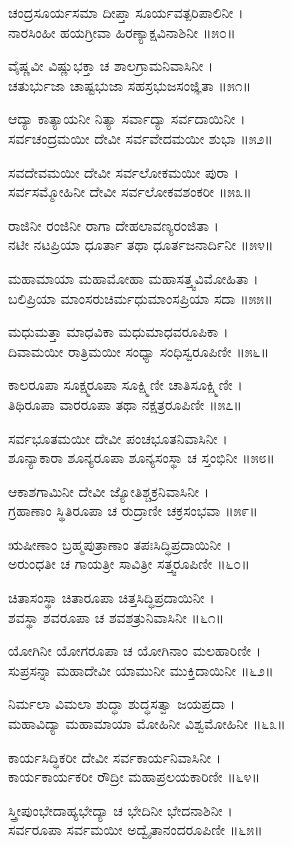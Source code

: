 ಚಂದ್ರಸೂರ್ಯಸಮಾ ದೀಪ್ತಾ ಸೂರ್ಯವತ್ಪರಿಪಾಲಿನೀ ।\\
ನಾರಸಿಂಹೀ ಹಯಗ್ರೀವಾ ಹಿರಣ್ಯಾಕ್ಷವಿನಾಶಿನೀ ॥೫೦॥

ವೈಷ್ಣವೀ ವಿಷ್ಣುಭಕ್ತಾ ಚ ಶಾಲಗ್ರಾಮನಿವಾಸಿನೀ ।\\
ಚತುರ್ಭುಜಾ ಚಾಷ್ಟಭುಜಾ ಸಹಸ್ರಭುಜಸಂಜ್ಞಿತಾ ॥೫೧॥

ಆದ್ಯಾ ಕಾತ್ಯಾಯನೀ ನಿತ್ಯಾ ಸರ್ವಾದ್ಯಾ ಸರ್ವದಾಯಿನೀ ।\\
ಸರ್ವಚಂದ್ರಮಯೀ ದೇವೀ ಸರ್ವವೇದಮಯೀ ಶುಭಾ ॥೫೨॥

ಸವದೇವಮಯೀ ದೇವೀ ಸರ್ವಲೋಕಮಯೀ ಪುರಾ ।\\
ಸರ್ವಸಮ್ಮೋಹಿನೀ ದೇವೀ ಸರ್ವಲೋಕವಶಂಕರೀ ॥೫೩॥

ರಾಜಿನೀ ರಂಜಿನೀ ರಾಗಾ ದೇಹಲಾವಣ್ಯರಂಜಿತಾ ।\\
ನಟೀ ನಟಪ್ರಿಯಾ ಧೂರ್ತಾ ತಥಾ ಧೂರ್ತಜನಾರ್ದಿನೀ ॥೫೪॥

ಮಹಾಮಾಯಾ ಮಹಾಮೋಹಾ ಮಹಾಸತ್ತ್ವವಿಮೋಹಿತಾ ।\\
ಬಲಿಪ್ರಿಯಾ ಮಾಂಸರುಚಿರ್ಮಧುಮಾಂಸಪ್ರಿಯಾ ಸದಾ ॥೫೫॥

ಮಧುಮತ್ತಾ ಮಾಧವಿಕಾ ಮಧುಮಾಧವರೂಪಿಕಾ ।\\
ದಿವಾಮಯೀ ರಾತ್ರಿಮಯೀ ಸಂಧ್ಯಾ ಸಂಧಿಸ್ವರೂಪಿಣೀ ॥೫೬॥

ಕಾಲರೂಪಾ ಸೂಕ್ಷ್ಮರೂಪಾ ಸೂಕ್ಷ್ಮಿಣೀ ಚಾತಿಸೂಕ್ಷ್ಮಿಣೀ ।\\
ತಿಥಿರೂಪಾ ವಾರರೂಪಾ ತಥಾ ನಕ್ಷತ್ರರೂಪಿಣೀ ॥೫೭॥

ಸರ್ವಭೂತಮಯೀ ದೇವೀ ಪಂಚಭೂತನಿವಾಸಿನೀ ।\\
ಶೂನ್ಯಾಕಾರಾ ಶೂನ್ಯರೂಪಾ ಶೂನ್ಯಸಂಸ್ಥಾ ಚ ಸ್ತಂಭಿನೀ ॥೫೮॥

ಆಕಾಶಗಾಮಿನೀ ದೇವೀ ಜ್ಯೋತಿಶ್ಚಕ್ರನಿವಾಸಿನೀ ।\\
ಗ್ರಹಾಣಾಂ ಸ್ಥಿತಿರೂಪಾ ಚ ರುದ್ರಾಣೀ ಚಕ್ರಸಂಭವಾ ॥೫೯॥

ಋಷೀಣಾಂ ಬ್ರಹ್ಮಪುತ್ರಾಣಾಂ ತಪಃಸಿದ್ಧಿಪ್ರದಾಯಿನೀ ।\\
ಅರುಂಧತೀ ಚ ಗಾಯತ್ರೀ ಸಾವಿತ್ರೀ ಸತ್ತ್ವರೂಪಿಣೀ ॥೬೦॥

ಚಿತಾಸಂಸ್ಥಾ ಚಿತಾರೂಪಾ ಚಿತ್ತಸಿದ್ಧಿಪ್ರದಾಯಿನೀ ।\\
ಶವಸ್ಥಾ ಶವರೂಪಾ ಚ ಶವಶತ್ರುನಿವಾಸಿನೀ ॥೬೧॥

ಯೋಗಿನೀ ಯೋಗರೂಪಾ ಚ ಯೋಗಿನಾಂ ಮಲಹಾರಿಣೀ ।\\
ಸುಪ್ರಸನ್ನಾ ಮಹಾದೇವೀ ಯಾಮುನೀ ಮುಕ್ತಿದಾಯಿನೀ ॥೬೨॥

ನಿರ್ಮಲಾ ವಿಮಲಾ ಶುದ್ಧಾ ಶುದ್ಧಸತ್ವಾ ಜಯಪ್ರದಾ ।\\
ಮಹಾವಿದ್ಯಾ ಮಹಾಮಾಯಾ ಮೋಹಿನೀ ವಿಶ್ವಮೋಹಿನೀ ॥೬೩॥

ಕಾರ್ಯಸಿದ್ಧಿಕರೀ ದೇವೀ ಸರ್ವಕಾರ್ಯನಿವಾಸಿನೀ ।\\
ಕಾರ್ಯಕಾರ್ಯಕರೀ ರೌದ್ರೀ ಮಹಾಪ್ರಲಯಕಾರಿಣೀ ॥೬೪॥

ಸ್ತ್ರೀಪುಂಭೇದಾಹ್ಯಭೇದ್ಯಾ ಚ ಭೇದಿನೀ ಭೇದನಾಶಿನೀ ।\\
ಸರ್ವರೂಪಾ ಸರ್ವಮಯೀ ಅದ್ವೈತಾನಂದರೂಪಿಣೀ ॥೬೫॥

